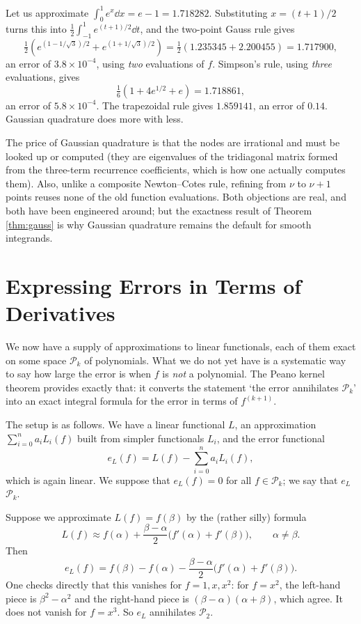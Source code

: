 \documentclass[a4paper]{scrartcl}
\newcommand{\Pn}[1]{\mathcal{P}_{#1}}
\begin{document}
\begin{example}
  Let us approximate $\int_0^1 e^x \dd x = e - 1 = 1.718282$. Substituting $x = (t+1)/2$ turns this into $\tfrac12\int_{-1}^1 e^{(t+1)/2}\dd t$, and the two-point Gauss rule gives
  $$
  \tfrac12\left(e^{(1 - 1/\sqrt3)/2} + e^{(1+1/\sqrt3)/2}\right) = \tfrac12(1.235345 + 2.200455) = 1.717900,
  $$
  an error of $3.8 \times 10^{-4}$, using \emph{two} evaluations of $f$. Simpson's rule, using \emph{three} evaluations, gives
  $$
  \tfrac16\left(1 + 4e^{1/2} + e\right) = 1.718861,
  $$
  an error of $5.8\times 10^{-4}$. The trapezoidal rule gives $1.859141$, an error of $0.14$. Gaussian quadrature does more with less.
\end{example}

\begin{remark}
  The price of Gaussian quadrature is that the nodes are irrational and must be looked up or computed (they are eigenvalues of the tridiagonal matrix formed from the three-term recurrence coefficients, which is how one actually computes them). Also, unlike a composite Newton--Cotes rule, refining from $\nu$ to $\nu+1$ points reuses none of the old function evaluations. Both objections are real, and both have been engineered around; but the exactness result of Theorem \ref{thm:gauss} is why Gaussian quadrature remains the default for smooth integrands.
\end{remark}


\section{Expressing Errors in Terms of Derivatives}

We now have a supply of approximations to linear functionals, each of them exact on some space $\Pn{k}$ of polynomials. What we do not yet have is a systematic way to say how large the error is when $f$ is \emph{not} a polynomial. The Peano kernel theorem provides exactly that: it converts the statement `the error annihilates $\Pn{k}$' into an exact integral formula for the error in terms of $f^{(k+1)}$.

The setup is as follows. We have a linear functional $L$, an approximation $\sum_{i=0}^n a_i L_i(f)$ built from simpler functionals $L_i$, and the error functional
$$
e_L(f) = L(f) - \sum_{i=0}^{n}a_i L_i(f),
$$
which is again linear. We suppose that $e_L(f) = 0$ for all $f \in \Pn{k}$; we say that $e_L$  $\Pn{k}$.

\begin{example}
  Suppose we approximate $L(f) = f(\beta)$ by the (rather silly) formula
  $$
  L(f) \approx f(\alpha) + \frac{\beta - \alpha}{2}\big(f'(\alpha) + f'(\beta)\big), \qquad \alpha \neq \beta.
  $$
  Then
  $$
  e_L(f) = f(\beta) - f(\alpha) - \frac{\beta-\alpha}{2}\big(f'(\alpha) + f'(\beta)\big).
  $$
  One checks directly that this vanishes for $f = 1, x, x^2$: for $f = x^2$, the left-hand piece is $\beta^2 - \alpha^2$ and the right-hand piece is $(\beta-\alpha)(\alpha+\beta)$, which agree. It does not vanish for $f = x^3$. So $e_L$ annihilates $\Pn{2}$.
\end{example}
\end{document}
